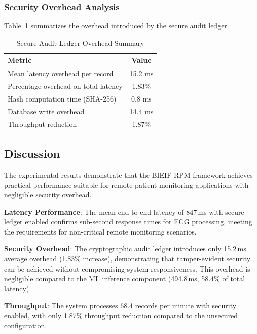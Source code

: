 \documentclass[10pt,twocolumn]{article}
\begin{document}
\subsubsection{Security Overhead Analysis}

Table~\ref{tab:security_overhead} summarizes the overhead introduced by the secure audit ledger.

\begin{table}[htbp]
\centering
\caption{Secure Audit Ledger Overhead Summary}
\label{tab:security_overhead}
\footnotesize
\begin{tabular}{@{}lc@{}}
\toprule
\textbf{Metric} & \textbf{Value} \\
\midrule
Mean latency overhead per record & 15.2 ms \\
Percentage overhead on total latency & 1.83\% \\
Hash computation time (SHA-256) & 0.8 ms \\
Database write overhead & 14.4 ms \\
Throughput reduction & 1.87\% \\
\bottomrule
\end{tabular}
\end{table}

\subsection{Discussion}
\label{subsec:discussion}

The experimental results demonstrate that the BIEIF-RPM framework achieves practical performance suitable for remote patient monitoring applications with negligible security overhead.

\textbf{Latency Performance}: The mean end-to-end latency of 847\,ms with secure ledger enabled confirms sub-second response times for ECG processing, meeting the requirements for non-critical remote monitoring scenarios.

\textbf{Security Overhead}: The cryptographic audit ledger introduces only 15.2\,ms average overhead (1.83\% increase), demonstrating that tamper-evident security can be achieved without compromising system responsiveness. This overhead is negligible compared to the ML inference component (494.8\,ms, 58.4\% of total latency).

\textbf{Throughput}: The system processes 68.4 records per minute with security enabled, with only 1.87\% throughput reduction compared to the unsecured configuration.
\end{document}
